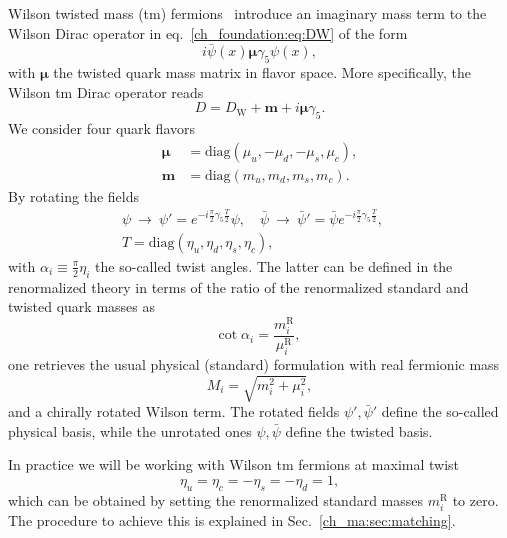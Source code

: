 Wilson twisted mass (tm) fermions~\citep{Frezzotti:1999vv,Frezzotti:2000nk,Frezzotti:2001ea,Frezzotti:2003ni,Shindler:2007vp} introduce an imaginary mass term to the Wilson Dirac operator in eq.~\eqref{ch_foundation:eq:DW} of the form
\begin{equation}
i\bar{\psi}(x)\boldsymbol{\mu}\gamma_5\psi(x),
\end{equation}
with $\boldsymbol{\mu}$ the twisted quark mass matrix in flavor space. More specifically, the Wilson tm Dirac operator reads
\begin{equation}
D=D_{\textrm{W}}+\boldsymbol{m}+i\boldsymbol{\mu}\gamma_5.
\end{equation}
We consider four quark flavors
\begin{align}
\boldsymbol{\mu}&={\textrm{diag}}\left(\mu_u,-\mu_d,-\mu_s,\mu_c\right), \\
\boldsymbol{m}&={\textrm{diag}}\left(m_u,m_d,m_s,m_c\right).
\end{align}
By rotating the fields
\begin{gather}
\label{ch_foundation:eq:chiral_rot}
\psi~\to~\psi' = e^{-i\frac{\pi}{2}\gamma_5 \frac{T}{2}}\psi, \quad
\bar{\psi}~\to~\bar{\psi}' = \bar{\psi} e^{-i\frac{\pi}{2}\gamma_5 \frac{T}{2}}, \quad \\
T = {\textrm{diag}}(\eta_u,\eta_d,\eta_s,\eta_c),
\end{gather}
with $\alpha_i\equiv\frac{\pi}{2}\eta_i$ the so-called twist angles. The latter can be defined in the renormalized theory in terms of the ratio of the renormalized standard and twisted quark masses as
\begin{equation}
{\textrm{cot}}\;\alpha_i=\frac{m_i^{\textrm{R}}}{\mu_i^{\textrm{R}}},
\end{equation}
one retrieves the usual physical (standard) formulation with real fermionic mass
\begin{equation}
M_i=\sqrt{m_i^2+\mu_i^2},
\end{equation}
and a chirally rotated Wilson term. The rotated fields $\psi',\bar{\psi}'$ define the so-called physical basis, while the unrotated ones $\psi,\bar{\psi}$ define the twisted basis.

In practice we will be working with Wilson tm fermions at maximal twist
\begin{equation}
\label{ch_foundation:eq:mte}
\eta_u=\eta_c=-\eta_s=-\eta_d=1,
\end{equation}
which can be obtained by setting the renormalized standard masses $m_i^{\textrm{R}}$ to zero. The procedure to achieve this is explained in Sec.~\ref{ch_ma:sec:matching}.


